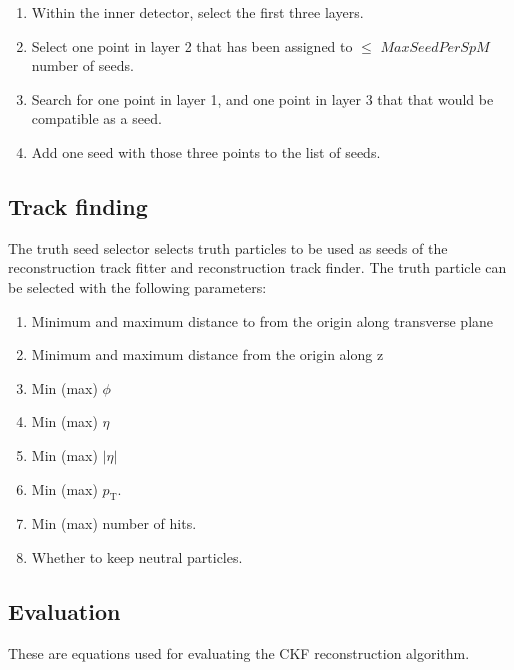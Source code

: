 \documentclass{article}
\newcommand{\pt}[0]{p_\textrm{T}}
\begin{document}
\begin{enumerate}
\item Within the inner detector, select the first three layers.
\item Select one point in layer 2 that has been assigned to $\leq$ $MaxSeedPerSpM$ number of seeds.
\item Search for one point in layer 1, and one point in layer 3 that that would be compatible as a seed.
\item Add one seed with those three points to the list of seeds.
\end{enumerate}


\subsection{Track finding}

The truth seed selector selects truth particles to be used as seeds of the reconstruction track fitter and reconstruction track finder. The truth particle can be selected with the following parameters:

\begin{enumerate}
\item Minimum and maximum distance to from the origin along transverse plane
\item Minimum and maximum distance from the origin along z
\item Min (max) $\phi$
\item Min (max) $\eta$
\item Min (max) $|\eta|$
\item Min (max) $\pt$.
\item Min (max) number of hits. 
\item Whether to keep neutral particles.
\end{enumerate}

\subsection{Evaluation}

These are equations used for evaluating the CKF reconstruction algorithm.

\end{document}
